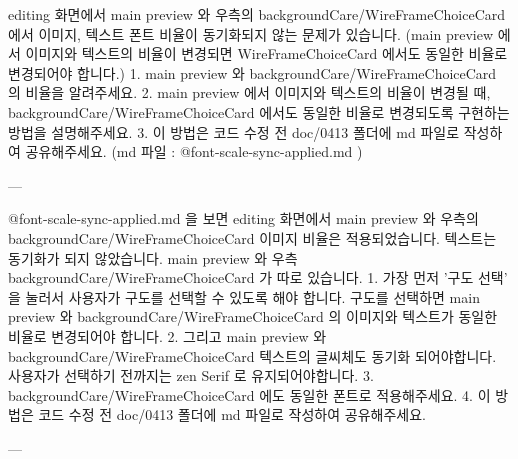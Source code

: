 editing 화면에서 main preview 와 우측의 backgroundCare/WireFrameChoiceCard 에서 이미지, 텍스트 폰트 비율이 동기화되지 않는 문제가 있습니다.
(main preview 에서 이미지와 텍스트의 비율이 변경되면 WireFrameChoiceCard 에서도 동일한 비율로 변경되어야 합니다.)
1. main preview 와 backgroundCare/WireFrameChoiceCard 의 비율을 알려주세요.
2. main preview 에서 이미지와 텍스트의 비율이 변경될 때, backgroundCare/WireFrameChoiceCard 에서도 동일한 비율로 변경되도록 구현하는 방법을 설명해주세요.
3. 이 방법은 코드 수정 전 doc/0413 폴더에 md 파일로 작성하여 공유해주세요.
(md 파일 : @font-scale-sync-applied.md )

---

@font-scale-sync-applied.md 을 보면 editing 화면에서 main preview 와 우측의 backgroundCare/WireFrameChoiceCard 이미지 비율은 적용되었습니다.
텍스트는 동기화가 되지 않았습니다. main preview 와 우측 backgroundCare/WireFrameChoiceCard 가 따로 있습니다.
1. 가장 먼저 '구도 선택' 을 눌러서 사용자가 구도를 선택할 수 있도록 해야 합니다. 구도를 선택하면 main preview 와 backgroundCare/WireFrameChoiceCard 의 이미지와 텍스트가 동일한 비율로 변경되어야 합니다.
2. 그리고 main preview 와 backgroundCare/WireFrameChoiceCard 텍스트의 글씨체도 동기화 되어야합니다. 사용자가 선택하기 전까지는 zen Serif 로 유지되어야합니다.
3. backgroundCare/WireFrameChoiceCard 에도 동일한 폰트로 적용해주세요.
4. 이 방법은 코드 수정 전 doc/0413 폴더에 md 파일로 작성하여 공유해주세요.

---